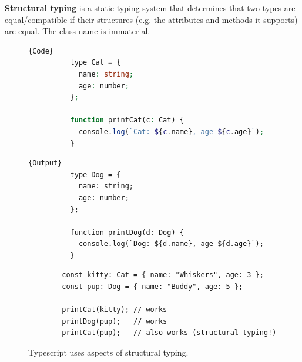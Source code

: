   \begin{definition}
    \label{def:structural-typing}
    \textbf{Structural typing} is a static typing system that determines that two types are equal/compatible if their structures (e.g. the attributes and methods it supports) are equal. The class name is immaterial. 

    \begin{figure}[H]
      \centering 
      \noindent\begin{minipage}{.5\textwidth}
        \begin{lstlisting}[language=php]{Code}
          type Cat = {
            name: string;
            age: number;
          };

          function printCat(c: Cat) {
            console.log(`Cat: ${c.name}, age ${c.age}`);
          }
        \end{lstlisting}
        \end{minipage}
        \hfill
        \begin{minipage}{.49\textwidth}
        \begin{lstlisting}[]{Output}
          type Dog = {
            name: string;
            age: number;
          };

          function printDog(d: Dog) {
            console.log(`Dog: ${d.name}, age ${d.age}`);
          }
        \end{lstlisting}
      \end{minipage}

      \begin{lstlisting}
        const kitty: Cat = { name: "Whiskers", age: 3 };
        const pup: Dog = { name: "Buddy", age: 5 };

        printCat(kitty); // works
        printDog(pup);   // works
        printCat(pup);   // also works (structural typing!)
      \end{lstlisting}
      \caption{Typescript uses aspects of structural typing.} 
      \label{fig:typescript_structural}
    \end{figure}
  \end{definition}

